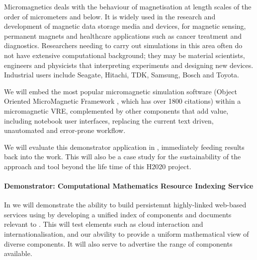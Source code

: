 Micromagnetics deals with the behaviour of
magnetisation at length scales of the order of
micrometers and below. It is widely used in the research and
development of magnetic data storage media and devices, for magnetic
sensing, permanent magnets and healthcare applications such as cancer
treatment and diagnostics. 
Researchers needing to carry out simulations in this area often do not
have  extensive computational background; they may be
material scientists, engineers and physicists that
interpreting  experiments and designing new devices. Industrial users include Seagate, Hitachi,
TDK, Samsung, Bosch and Toyota.


We will embed the most popular micromagnetic
simulation software (Object Oriented MicroMagnetic Framework
\cite{OOMMF-url}, which has over 1800 citations) within a micromagnetic VRE, complemented by other
components that add value, including notebook user interfaces,
replacing the current text driven, unautomated and error-prone workflow.

We will evaluate this demonstrator application in 
, immediately feeding
results back into the \TheProject work. This will also
be a case study for the sustainability of the approach and tool beyond
the life time of this H2020 project.

\paragraph{Demonstrator: Computational Mathematics Resource Indexing
Service}

In  
we will demonstrate the ability to build persistemnt highly-linked
web-based services using \TheProject by developing a unified index of
components and documents relevant to \TheProject. This will test
elements such as cloud interaction and internationalisation, and our
abvility to provide a uniform mathematical view of diverse
components. It will also serve
to advertise the range of components available.

